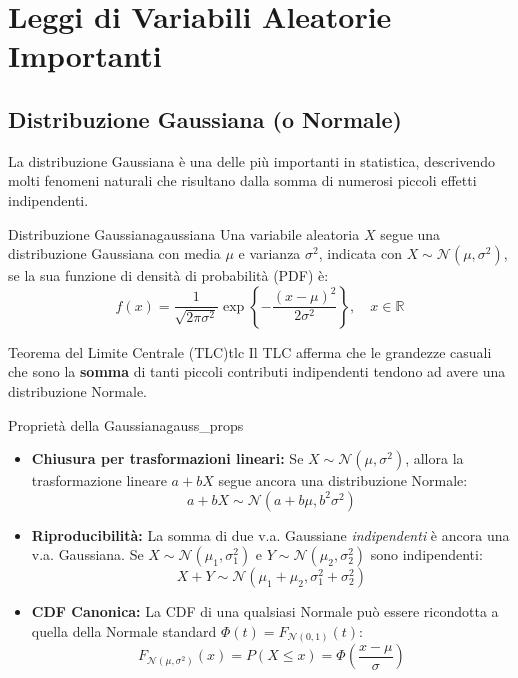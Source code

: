 \section{Leggi di Variabili Aleatorie Importanti}\label{sec:leggi_va}

\subsection{Distribuzione Gaussiana (o Normale)}
La distribuzione Gaussiana è una delle più importanti in statistica, descrivendo molti fenomeni naturali che risultano dalla somma di numerosi piccoli effetti indipendenti.

\begin{definizione}{Distribuzione Gaussiana}{gaussiana}
Una variabile aleatoria \(X\) segue una distribuzione Gaussiana con media \(\mu\) e varianza \(\sigma^2\), indicata con \(X \sim \mathcal{N}(\mu, \sigma^2)\), se la sua funzione di densità di probabilità (PDF) è:
\[
f(x) = \frac{1}{\sqrt{2\pi\sigma^2}} \exp\left\{ -\frac{(x-\mu)^2}{2\sigma^2} \right\}, \quad x \in \mathbb{R}
\]

\end{definizione}

\begin{nota}{Teorema del Limite Centrale (TLC)}{tlc}
Il TLC afferma che le grandezze casuali che sono la \textbf{somma} di tanti piccoli contributi indipendenti tendono ad avere una distribuzione Normale.
\end{nota}

\begin{proposizione}{Proprietà della Gaussiana}{gauss_props}
\begin{itemize}
    \item \textbf{Chiusura per trasformazioni lineari:} Se \(X \sim \mathcal{N}(\mu, \sigma^2)\), allora la trasformazione lineare \(a + bX\) segue ancora una distribuzione Normale:
    \[ a+bX \sim \mathcal{N}(a+b\mu, b^2\sigma^2) \]
    \item \textbf{Riproducibilità:} La somma di due v.a. Gaussiane \emph{indipendenti} è ancora una v.a. Gaussiana. Se \(X \sim \mathcal{N}(\mu_1, \sigma_1^2)\) e \(Y \sim \mathcal{N}(\mu_2, \sigma_2^2)\) sono indipendenti:
    \[ X+Y \sim \mathcal{N}(\mu_1+\mu_2, \sigma_1^2+\sigma_2^2) \]
    \item \textbf{CDF Canonica:} La CDF di una qualsiasi Normale può essere ricondotta a quella della Normale standard \( \Phi(t) = F_{\mathcal{N}(0,1)}(t) \):
    \[ F_{\mathcal{N}(\mu,\sigma^2)}(x) = P(X \le x) = \Phi\left(\frac{x-\mu}{\sigma}\right) \]
\end{itemize}
\end{proposizione}

